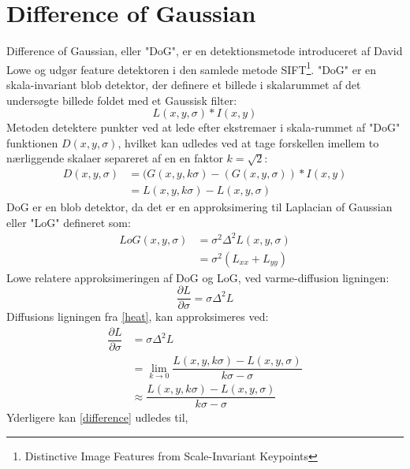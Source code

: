 \section{Difference of Gaussian}
Difference of Gaussian, eller "DoG", er en detektionsmetode introduceret  af David Lowe \cite{SIFT} og udgør feature detektoren i den samlede metode SIFT\footnote{Distinctive Image Features
from Scale-Invariant Keypoints}. "DoG" er en skala-invariant blob detektor, der definere et billede i skalarummet af det undersøgte billede foldet med et Gaussisk filter:
\begin{equation}
L(x,y,\sigma) \ast I(x,y)
\end{equation}
Metoden detektere punkter ved at lede efter ekstremaer i skala-rummet af "DoG" funktionen $ D(x,y,\sigma) $, hvilket kan udledes ved at tage forskellen imellem to nærliggende skalaer separeret af en en faktor $k=\sqrt{2}$:
\begin{equation}
\begin{split}
D(x,y,\sigma) &= (G(x,y,k\sigma)-(G(x,y,\sigma))\ast I(x,y) \\
           &= L(x,y,k \sigma)-L(x,y,\sigma)
\end{split}
\end{equation}
DoG er en blob detektor, da det er en approksimering til Laplacian of Gaussian eller "LoG" defineret som:
\begin{equation}
\begin{split}
LoG(x,y,\sigma) &= \sigma^2 \Delta^2L(x,y,\sigma) \\
                &= \sigma^2 (L_{xx}+L_{yy})
\end{split}
\end{equation}
Lowe relatere approksimeringen af DoG og LoG, ved varme-diffusion ligningen:
\begin{equation}
\dfrac{\partial L}{\partial \sigma} = \sigma \Delta^2L
\label{heat}
\end{equation}
Diffusions ligningen fra \eqref{heat}, kan approksimeres ved:
\begin{equation}
\begin{split}
\dfrac{\partial L}{\partial \sigma} &= \sigma \Delta^2L \\
&= \lim_{k \to 0} \dfrac{L(x,y,k\sigma)-L(x,y,\sigma)}{k\sigma-\sigma} \\
&\approx \dfrac{L(x,y,k\sigma)-L(x,y,\sigma)}{k\sigma-\sigma}
\end{split}
\label{difference}
\end{equation}
Yderligere kan \eqref{difference} udledes til,
